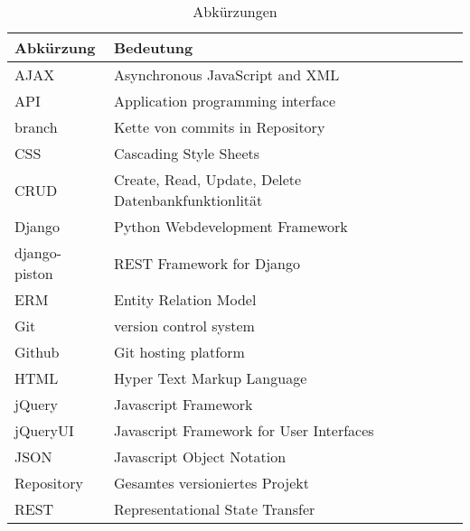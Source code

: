 \begin{table}[!ht]
\begin{center}
    \begin{tabular}{llp{8cm}l}
        \toprule Abkürzung & Bedeutung \\
        \midrule AJAX & Asynchronous JavaScript and XML\\
        \midrule API & Application programming interface\\
        \midrule branch & Kette von commits in Repository\\
        \midrule CSS & Cascading Style Sheets\\
        \midrule CRUD & Create, Read, Update, Delete Datenbankfunktionlität \\
        \midrule Django & Python Webdevelopment Framework\\
        \midrule django-piston & REST Framework for Django\\
        \midrule ERM & Entity Relation Model \\
        \midrule Git & version control system \\
        \midrule Github & Git hosting platform \\
        \midrule HTML & Hyper Text Markup Language\\
        \midrule jQuery & Javascript Framework\\
        \midrule jQueryUI & Javascript Framework for User Interfaces\\
        \midrule JSON & Javascript Object Notation\\
        \midrule Repository & Gesamtes versioniertes Projekt \\
        \midrule REST & Representational State Transfer\\
        \bottomrule
    \end{tabular}
    \caption{Abkürzungen}
    \label{Abkürzungen}
\end{center}
\end{table}
